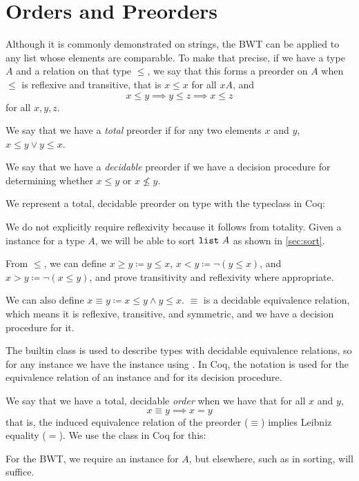 \documentclass[11pt]{thesis}
\begin{document}
\section{Orders and Preorders}
\label{sec:ord}

Although it is commonly demonstrated on strings, the BWT can be
applied to any list whose elements are comparable. To make that
precise, if we have a type $A$ and a relation on that type $\le$, we say
that this forms a preorder on $A$ when $\le$ is reflexive and transitive, that is
$x \le x$ for all $xA$, and
\begin{equation*}
  x \le y \implies y \le z \implies x \le z
\end{equation*}
for all $x,y,z$.

We say that we have a \textit{total} preorder if for any two elements
$x$ and $y$, $x \le y \lor y \le x$.

We say that we have a \textit{decidable} preorder if we have a
decision procedure for determining whether $x \le y$ or $x \not\le y$.

We represent a total, decidable preorder on type with the
 typeclass in Coq:

We do not explicitly require reflexivity because it follows from
totality. Given a  instance for a type $A$, we will be
able to sort $\texttt{list}~A$ as shown in \cref{sec:sort}.

From $\le$, we can define $x \ge y \coloneqq y \le x$, $x < y \coloneqq
\lnot (y \le x)$, and $x > y \coloneqq \lnot (x \le y)$, and prove
transitivity and reflexivity where appropriate.

We can also define $x \equiv y \coloneqq x \le y \land y \le x$. $\equiv$ is a
decidable equivalence relation, which means it is reflexive,
transitive, and symmetric, and we have a decision procedure for it.


The builtin class  is used to describe types with
decidable equivalence relations, so for any  instance
we have the  instance  using
. In Coq, the notation \var{===} is used for the
equivalence relation of an  instance and \var{==} for
its decision procedure.

We say that we have a total, decidable \textit{order} when we have
that for all $x$ and $y$,
\begin{equation*}
  x \equiv y \implies x = y
\end{equation*}
that is, the induced equivalence relation of the preorder ($\equiv$)
implies Leibniz equality ($=$). We use the  class in Coq
for this:

For the BWT, we require an  instance for $A$, but
elsewhere, such as in sorting,  will suffice.
\end{document}

